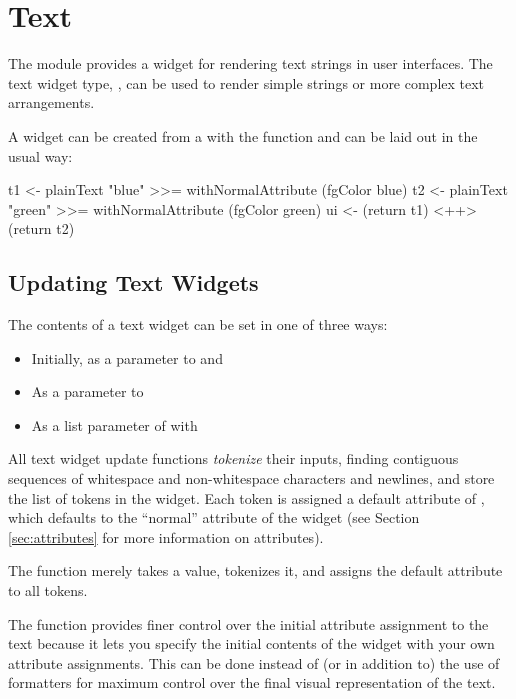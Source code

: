 \section{Text}
\label{sec:text}

The  module provides a widget for rendering text strings in
user interfaces.  The text widget type, , can
be used to render simple strings or more complex text arrangements.

A  widget can be created from a  with the
 function and can be laid out in the usual way:

\begin{haskellcode}
 t1 <- plainText "blue" >>= withNormalAttribute (fgColor blue)
 t2 <- plainText "green" >>= withNormalAttribute (fgColor green)
 ui <- (return t1) <++> (return t2)
\end{haskellcode}

\subsection{Updating Text Widgets}
\label{sec:updatingText}

The contents of a text widget can be set in one of three ways:
\begin{itemize}
\item Initially, as a parameter to  and 
\item As a  parameter to 
\item As a list parameter of  with
\end{itemize}

All text widget update functions \textit{tokenize} their inputs,
finding contiguous sequences of whitespace and non-whitespace
characters and newlines, and store the list of tokens in the widget.
Each token is assigned a default attribute of , which
defaults to the ``normal'' attribute of the widget (see Section
\ref{sec:attributes} for more information on attributes).

The  function merely takes a  value, tokenizes
it, and assigns the default attribute to all tokens.

The  function provides finer control over the
initial attribute assignment to the text because it lets you specify
the initial contents of the widget with your own attribute
assignments.  This can be done instead of (or in addition to) the use
of formatters for maximum control over the final visual representation
of the text.


